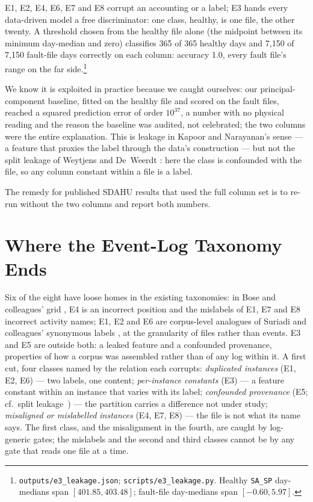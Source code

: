 \documentclass[runningheads]{llncs}
\begin{document}
E1, E2, E4, E6, E7 and E8 corrupt an accounting or a label; E3 hands every data-driven model a free discriminator: one class, healthy, is one file, the other twenty. A threshold chosen from the healthy file alone (the midpoint between its minimum day-median and zero) classifies 365 of 365 healthy days and 7{,}150 of 7{,}150 fault-file days correctly on each column: accuracy 1.0, every fault file's range on the far side.\footnote{\texttt{outputs/e3\_leakage.json}; \texttt{scripts/e3\_leakage.py}. Healthy \texttt{SA\_SP} day-medians span $[401.85, 403.48]$; fault-file day-medians span $[-0.60, 5.97]$.}

We know it is exploited in practice because we caught ourselves: our principal-component baseline, fitted on the healthy file and scored on the fault files, reached a squared prediction error of order $10^{37}$, a number with no physical reading and the reason the baseline was audited, not celebrated; the two columns were the entire explanation. This is leakage in Kapoor and Narayanan's sense \cite{kapoor2023leakage} --- a feature that proxies the label through the data's construction --- but not the split leakage of Weytjens and De~Weerdt \cite{weytjens2022dataleakage}: here the class is confounded with the file, so any column constant within a file is a label.

The remedy for published SDAHU results that used the full column set is to re-run without the two columns and report both numbers.

\section{Where the Event-Log Taxonomy Ends}
\label{sec:taxonomy}

Six of the eight have loose homes in the existing taxonomies: in Bose and colleagues' grid \cite{bose2013dataquality}, E4 is an incorrect position and the mislabels of E1, E7 and E8 incorrect activity names; E1, E2 and E6 are corpus-level analogues of Suriadi and colleagues' synonymous labels \cite{suriadi2017imperfection}, at the granularity of files rather than events. E3 and E5 are outside both: a leaked feature and a confounded provenance, properties of how a corpus was assembled rather than of any log within it. A first cut, four classes named by the relation each corrupts: \emph{duplicated instances} (E1, E2, E6) --- two labels, one content; \emph{per-instance constants} (E3) --- a feature constant within an instance that varies with its label; \emph{confounded provenance} (E5; cf.\ split leakage~\cite{weytjens2022dataleakage}) --- the partition carries a difference not under study; \emph{misaligned or mislabelled instances} (E4, E7, E8) --- the file is not what its name says. The first class, and the misalignment in the fourth, are caught by log-generic gates; the mislabels and the second and third classes cannot be by any gate that reads one file at a time.
\end{document}
